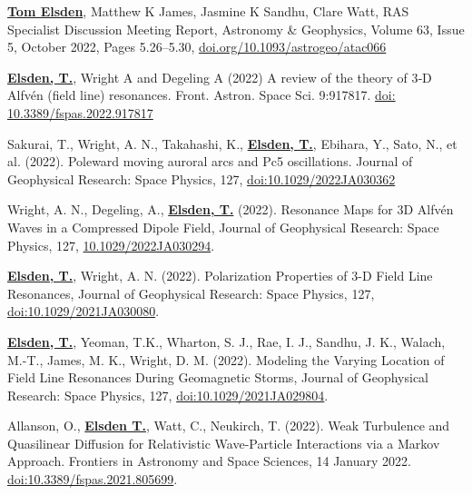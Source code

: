 \documentclass[11pt,a4paper]{article} %
\newcommand\vs{\vspace{-0.25cm}}
\begin{document}
\begin{etaremune}
\vs
\item \underline{\textbf{Tom Elsden}}, Matthew K James, Jasmine K Sandhu, Clare Watt, RAS Specialist Discussion Meeting Report, Astronomy \& Geophysics, Volume 63, Issue 5, October 2022, Pages 5.26–5.30, \newline \href{https://doi.org/10.1093/astrogeo/atac066}{doi.org/10.1093/astrogeo/atac066}

\vs
\item  \underline{\textbf{Elsden, T.}}, Wright A and Degeling A (2022) A review of the theory of 3‐D Alfvén (field line) resonances. Front. Astron. Space Sci. 9:917817. \href{https://doi.org/10.3389/fspas.2022.917817}{doi: 10.3389/fspas.2022.917817}

\vs
\item Sakurai, T., Wright, A. N., Takahashi, K., \underline{\textbf{Elsden, T.}}, Ebihara, Y., Sato, N., et al. (2022). Poleward moving auroral arcs and Pc5 oscillations. Journal of Geophysical Research: Space Physics, 127, \href{https://doi.org/10.1029/2022JA030362}{doi:10.1029/2022JA030362}

\vs
\item Wright, A. N., Degeling, A., \underline{\textbf{Elsden, T.}} (2022). Resonance Maps for 3D Alfv\'{e}n Waves in a Compressed Dipole Field, Journal of Geophysical Research: Space Physics, 127, \href{https://doi.org/10.1029/2022JA030294}{10.1029/2022JA030294}. 

\vs
\item \underline{\textbf{Elsden, T.}}, Wright, A. N. (2022). Polarization Properties of 3-D Field Line Resonances, Journal of Geophysical Research: Space Physics, 127, \href{https://doi.org/10.1029/2021JA030080}{doi:10.1029/2021JA030080}.

\vs
\item \underline{\textbf{Elsden, T.}}, Yeoman, T.K., Wharton, S. J., Rae, I. J., Sandhu, J. K., Walach, M.-T., James, M. K., Wright, D. M. (2022). Modeling the Varying Location of Field Line Resonances During Geomagnetic Storms, Journal of Geophysical Research: Space Physics, 127, \href{https://doi.org/10.1029/2021JA029804}{doi:10.1029/2021JA029804}.

\vs
\item Allanson, O., \underline{\textbf{Elsden T.}}, Watt, C., Neukirch, T. (2022). Weak Turbulence and Quasilinear Diffusion for Relativistic Wave-Particle Interactions via a Markov Approach. Frontiers in Astronomy and Space Sciences, 14 January 2022. \href{https://doi.org/10.3389/fspas.2021.805699}{doi:10.3389/fspas.2021.805699}.  


\end{etaremune}
\end{document}
